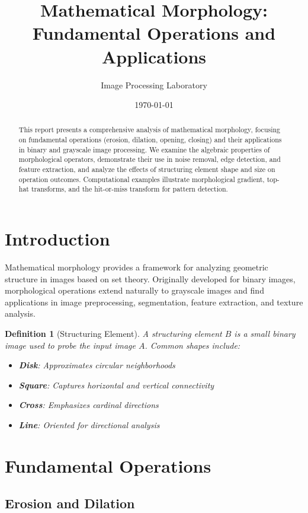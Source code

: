 \documentclass[a4paper, 11pt]{article}
\title{Mathematical Morphology: Fundamental Operations and Applications}
\author{Image Processing Laboratory}
\date{\today}
\newtheorem{definition}{Definition}[section]
\begin{document}
\maketitle

\begin{abstract}
This report presents a comprehensive analysis of mathematical morphology, focusing on fundamental
operations (erosion, dilation, opening, closing) and their applications in binary and grayscale
image processing. We examine the algebraic properties of morphological operators, demonstrate
their use in noise removal, edge detection, and feature extraction, and analyze the effects of
structuring element shape and size on operation outcomes. Computational examples illustrate
morphological gradient, top-hat transforms, and the hit-or-miss transform for pattern detection.
\end{abstract}

\section{Introduction}

Mathematical morphology provides a framework for analyzing geometric structure in images based
on set theory. Originally developed for binary images, morphological operations extend naturally
to grayscale images and find applications in image preprocessing, segmentation, feature
extraction, and texture analysis.

\begin{definition}[Structuring Element]
A structuring element $B$ is a small binary image used to probe the input image $A$. Common
shapes include:
\begin{itemize}
\item \textbf{Disk}: Approximates circular neighborhoods
\item \textbf{Square}: Captures horizontal and vertical connectivity
\item \textbf{Cross}: Emphasizes cardinal directions
\item \textbf{Line}: Oriented for directional analysis
\end{itemize}
\end{definition}

\section{Fundamental Operations}

\subsection{Erosion and Dilation}
\end{document}
